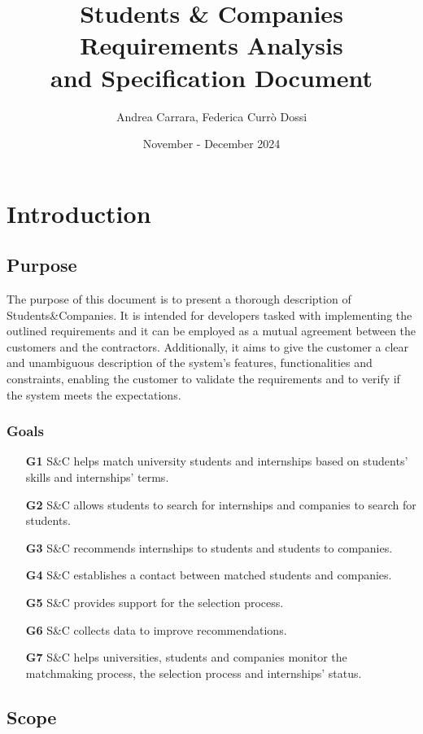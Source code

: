 \documentclass[a4paper, oneside]{book}
\title{
  Students \& Companies \\
  \Huge Requirements Analysis \\
  and Specification Document
}
\author{Andrea Carrara, Federica Currò Dossi}
\date{November - December 2024}
\begin{document}
\maketitle

\tableofcontents

\chapter{Introduction}
\section{Purpose}
The purpose of this document is to present a thorough description of {Students\&Companies}. It is intended for developers tasked with implementing the outlined requirements and it can be employed as a mutual agreement between the customers and the contractors. Additionally, it aims to give the customer a clear and unambiguous description of the system's features, functionalities and constraints, enabling the customer to validate the requirements and to verify if the system meets the expectations. 

\subsection{Goals}

\begin{itemize}
    \item [\textbf{G1}] S\&C helps match university students and internships based on students' skills and internships' terms.
    \item [\textbf{G2}] S\&C allows students to search for internships and companies to search for students.
    \item [\textbf{G3}] S\&C recommends internships to students and students to companies.
    \item [\textbf{G4}] S\&C establishes a contact between matched students and companies.
    \item [\textbf{G5}] S\&C provides support for the selection process.
    \item [\textbf{G6}] S\&C collects data to improve recommendations.
    \item [\textbf{G7}] S\&C helps universities, students and companies monitor the matchmaking process, the selection process and internships' status.
\end{itemize}

\section{Scope}
\end{document}

